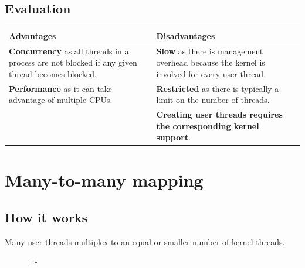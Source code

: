 \documentclass[a4paper]{systems-software}
\begin{document}
\subsection*{Evaluation}

\begin{longtabu} to \textwidth {|X[1,l]|X[1,l]|}
    \hline
    \textbf{Advantages} & \textbf{Disadvantages}
    \\ \hline
    \textbf{Concurrency} as all threads in a process are not blocked if any given thread becomes blocked.
    &
    \textbf{Slow} as there is management overhead because the kernel is involved for every user thread.
    \\ \hline
    \textbf{Performance} as it can take advantage of multiple CPUs.
    &
    \textbf{Restricted} as there is typically a limit on the number of threads.
	\\ \hline
    &
    \textbf{Creating user threads requires the corresponding kernel support}.
	\\ \hline
\end{longtabu}


\section*{Many-to-many mapping}

\subsection*{How it works}

Many user threads multiplex to an equal or smaller number of kernel threads.

\begin{figure}[H]
  \lineskip=-\fboxrule
\end{figure}
\end{document}
